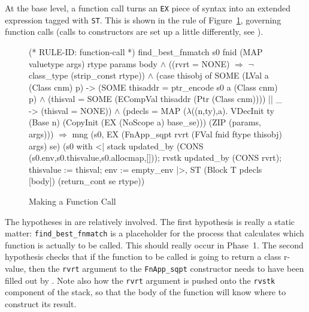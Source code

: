 \documentclass[11pt]{article}
\begin{document}
%
%
%
At the base level, a function call turns an \texttt{EX} piece of
syntax into an extended expression tagged with \texttt{ST}.  This is
shown in the rule  of
Figure~\ref{fig:function-call}, governing function calls (calls to
constructors are set up a little differently, see
).
\begin{figure}[hbtp]
\begin{stdrule}
(* RULE-ID: function-call *)
     find_best_fnmatch s0 fnid (MAP valuetype args) rtype
                       params body \(\land\)
     ((rvrt = NONE) \(\Rightarrow\) \(\neg\)class_type (strip_const rtype)) \(\land\)
     (case thisobj of
         SOME (LVal a (Class cnm) p) ->
            (SOME thisaddr = ptr_encode s0 a (Class cnm) p) \(\land\)
            (thisval = SOME (ECompVal thisaddr
                                      (Ptr (Class cnm))))
      || _ -> (thisval = NONE)) \(\land\)
     (pdecls = MAP (\(\lambda\)((n,ty),a).
                          VDecInit ty (Base n)
                             (CopyInit (EX (NoScope a) base_se)))
                   (ZIP (params, args)))
   \(\Rightarrow\)
     mng (s0, EX (FnApp_sqpt rvrt
                             (FVal fnid ftype thisobj)
                             args)
                 se)
         (s0 with <|
            stack updated_by
                  (CONS (s0.env,s0.thisvalue,s0.allocmap,[]));
            rvstk updated_by (CONS rvrt);
            thisvalue := thisval;
            env := empty_env
          |>,
          ST (Block T pdecls [body]) (return_cont se rtype))
\end{stdrule}
\caption{Making a Function Call}
\label{fig:function-call}
\end{figure}
%

The hypotheses in  are relatively involved.  The
first hypothesis is really a static matter: \texttt{find_best_fnmatch}
is a placeholder for the process that calculates which function is
actually to be called.  This should really occur in Phase~1.  The
second hypothesis checks that if the function to be called is going to
return a class r-value, then the \texttt{rvrt} argument to the
\texttt{FnApp_sqpt} constructor needs to have been filled out by
.  Note also how the \texttt{rvrt} argument is
pushed onto the \texttt{rvstk} component of the stack, so that the
body of the function will know where to construct its result.
\end{document}
